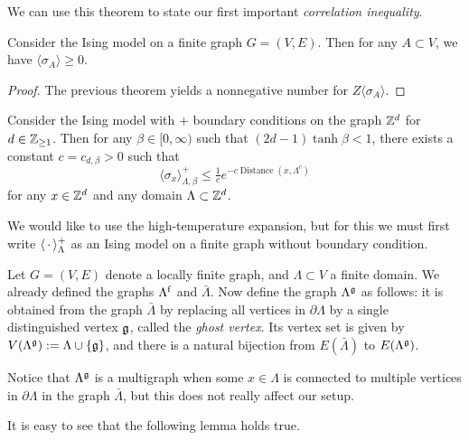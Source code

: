 We can use this theorem to state our first important \emph{correlation inequality}.

\begin{theorem}
    Consider the Ising model on a finite graph $G=(V,E)$.
    Then for any $A\subset V$, we have
    \(
        \langle\sigma_A\rangle\geq 0
    \).
\end{theorem}

\begin{proof}
    The previous theorem yields a nonnegative number for $Z\langle\sigma_A\rangle$.
\end{proof}

\begin{theorem}
    \label{thm:Exponential decay at high temperature}
    Consider the Ising model with $+$ boundary conditions 
    on the graph $\mathbb Z^d$ for $d\in\mathbb Z_{\geq 1}$.
    Then for any $\beta\in[0,\infty)$
    such that $(2d-1)\tanh\beta < 1$,
    there exists a constant $c=c_{d,\beta}>0$
    such that
    \[
        \langle\sigma_x\rangle_{\Lambda,\beta}^+
        \leq \tfrac1ce^{-c \operatorname{Distance}(x,\Lambda^c)}
    \]
    for any $x\in\mathbb Z^d$ and any domain $\Lambda\subset\mathbb Z^d$.
\end{theorem}

We would like to use the high-temperature expansion,
but for this we must first write $\langle\,\cdot\,\rangle^+_\Lambda$
as an Ising model on a finite graph without boundary condition.

\begin{definition}
    \label{definition:ghost}
    Let $G=(V,E)$ denote a locally finite graph,
    and $\Lambda\subset V$ a finite domain.
    We already defined the graphs $\Lambda^{\operatorname{f}}$ and $\bar\Lambda$.
    Now define the graph $\Lambda^\mathfrak g$ as follows:
    it is obtained from the graph $\bar\Lambda$
    by replacing all vertices in $\partial\Lambda$ by a single distinguished
    vertex $\mathfrak g$, called the \emph{ghost vertex}.
    Its vertex set is given by
    \(V(\Lambda^\mathfrak g):=\Lambda\cup\{\mathfrak g\}\),
    and there is a natural bijection from $E(\bar\Lambda)$
    to $E(\Lambda^\mathfrak g)$.

    Notice that $\Lambda^\mathfrak g$ is a multigraph when some $x\in\Lambda$
    is connected to multiple vertices in $\partial\Lambda$ in the graph $\bar\Lambda$,
    but this does not really affect our setup.
\end{definition}

It is easy to see that the following lemma holds true.

